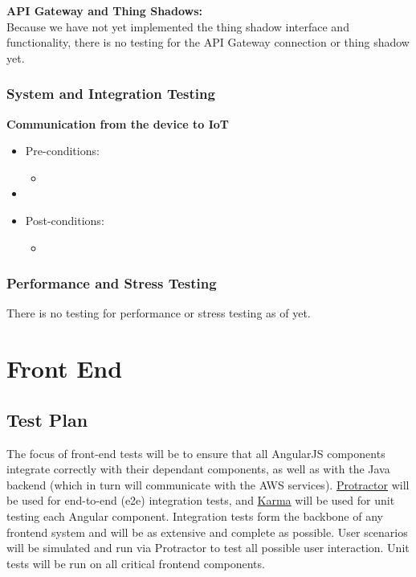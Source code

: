 \documentclass{article}
\begin{document}
			\textbf{API Gateway and Thing Shadows:}
			\\
			Because we have not yet implemented the thing shadow interface and functionality, there is no testing for the API Gateway connection or thing shadow yet.
			
			\subsubsection{System and Integration Testing}
			\textbf{Communication from the device to IoT}
			\\
				\begin{itemize}
					\item Pre-conditions:
					\begin{itemize}
						\item 
					\end{itemize}
					\item 
					\item Post-conditions:
					\begin{itemize}
						\item 
					\end{itemize}
				\end{itemize}
				
			
			
			\subsubsection{Performance and Stress Testing}
			There is no testing for performance or stress testing as of yet.
\newpage

\section{Front End}
	\subsection{Test Plan}
	The focus of front-end tests will be to ensure that all AngularJS components integrate correctly with their dependant components, as well as with the Java backend (which in turn will communicate with the AWS services). \href{http://www.protractortest.org/#/}{Protractor} will be used for end-to-end (e2e) integration tests, and \href{https://karma-runner.github.io/1.0/index.html}{Karma} will be used for unit testing each Angular component. Integration tests form the backbone of any frontend system and will be as extensive and complete as possible. User scenarios will be simulated and run via Protractor to test all possible user interaction. Unit tests will be run on all critical frontend components.
	
\end{document}
